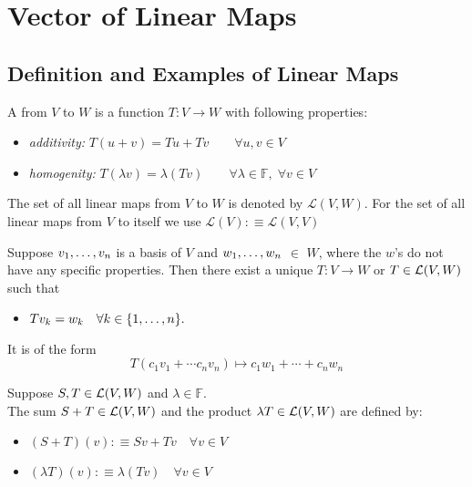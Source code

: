 \section{Vector of Linear Maps}

\subsection{Definition and Examples of Linear Maps}

\begin{mydef} 
  A \lm from $V$ to $W$ is a function $T:V\to W$ with following properties:
  \begin{itemize}
    \item \emph{additivity:} $T(u+v)=Tu + Tv \qquad \forall u,v \in V$
    \item \emph{homogenity:} $T(\lambda v)=\lambda (Tv) \qquad
    \forall \lambda \in \mathbb{F}, \; \forall v\in V$
  \end{itemize}
\end{mydef}

\begin{mydef} 
  The set of all linear maps from $V$ to $W$ is denoted by $\mathcal{L}(V,W)$. For the set of all linear maps from $V$ to itself we use $\mathcal{L}(V) :\equiv \mathcal{L}(V,V)$
\end{mydef}

\setcounter{thm}{3}
\begin{thm}
  Suppose $v_1, \dots, v_n$ is a basis of $V$ and $w_1, \dots, w_n$ $\in$ $W$, where the $w$'s do not have any specific properties. Then there exist a unique \lm $T:V\to W$ or $T \in \mathcal{L}(V,W)$ such that
  \begin{itemize}
    \item[] $Tv_{k} = w_k \quad \forall k \in \{1, \dots, n \}.$
  \end{itemize}
  It is of the form \begin{equation}
    T(c_1 v_1 + \cdots c_n v_n) \mapsto c_1 w_1 + \cdots + c_n w_n
  \end{equation}
\end{thm}

\setcounter{thm}{4}
\begin{mydef} 
  Suppose $S, T \in {\mathcal{L}(V,W)}$ and $\lambda \in \mathbb{F}.$ \\
  The sum $S+T \in \mathcal{L} (V,W)$ and the product $\lambda T \in \mathcal{L} (V,W)$ are defined by:
  \begin{itemize}
    \item $(S+T)(v) :\equiv Sv+Tv \quad \forall v \in V$
    \item $(\lambda T)(v) : \equiv \lambda (Tv) \quad \forall v \in V$
  \end{itemize}
\end{mydef}

